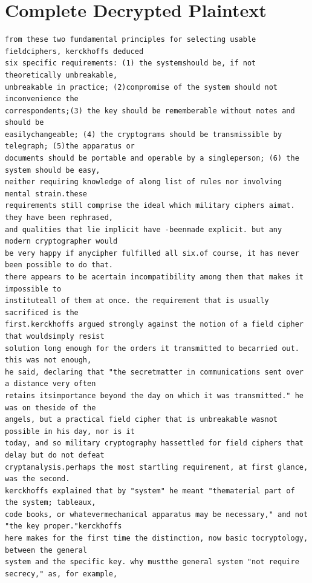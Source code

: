 \documentclass[12pt,a4paper]{article}
\begin{document}
\section{Complete Decrypted Plaintext}

\begin{lstlisting}[caption={Fully Decrypted Plaintext (Variant 19)}]
from these two fundamental principles for selecting usable fieldciphers, kerckhoffs deduced 
six specific requirements: (1) the systemshould be, if not theoretically unbreakable, 
unbreakable in practice; (2)compromise of the system should not inconvenience the 
correspondents;(3) the key should be rememberable without notes and should be 
easilychangeable; (4) the cryptograms should be transmissible by telegraph; (5)the apparatus or 
documents should be portable and operable by a singleperson; (6) the system should be easy, 
neither requiring knowledge of along list of rules nor involving mental strain.these 
requirements still comprise the ideal which military ciphers aimat. they have been rephrased, 
and qualities that lie implicit have -beenmade explicit. but any modern cryptographer would 
be very happy if anycipher fulfilled all six.of course, it has never been possible to do that. 
there appears to be acertain incompatibility among them that makes it impossible to 
instituteall of them at once. the requirement that is usually sacrificed is the 
first.kerckhoffs argued strongly against the notion of a field cipher that wouldsimply resist 
solution long enough for the orders it transmitted to becarried out. this was not enough, 
he said, declaring that "the secretmatter in communications sent over a distance very often 
retains itsimportance beyond the day on which it was transmitted." he was on theside of the 
angels, but a practical field cipher that is unbreakable wasnot possible in his day, nor is it 
today, and so military cryptography hassettled for field ciphers that delay but do not defeat 
cryptanalysis.perhaps the most startling requirement, at first glance, was the second. 
kerckhoffs explained that by "system" he meant "thematerial part of the system; tableaux, 
code books, or whatevermechanical apparatus may be necessary," and not "the key proper."kerckhoffs 
here makes for the first time the distinction, now basic tocryptology, between the general 
system and the specific key. why mustthe general system "not require secrecy," as, for example, 

\end{lstlisting}
\end{document}
